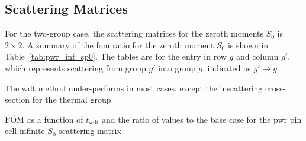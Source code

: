 \subsection{Scattering Matrices}
\label{sec:pwr_inf_total}

For the two-group case, the scattering matrices for the zeroth
moments $S_0$ is $2 \times 2$. A summary of the \gls{fom} ratio
for the zeroth moment $S_0$ is shown in Table~\ref{tab:pwr_inf_sp0}. The
tables are for the entry in row $g$ and column $g'$, which represents
scattering from group $g'$ into group $g$, indicated as $g' \to g$.

The \gls{wdt} method under-performs in most cases, except the
inscattering cross-section for the thermal group. 

\begin{table}[hbtp]
  \centering
  \caption[$\overline{\mathrm{FOM}}$ and ratio for
  the \acrshort{pwr} pin cell infinite $S_0$ scattering matrix.]{$\overline{\mathrm{FOM}}$ as a function of
    $t_{\mathrm{wdt}}$ and the ratio of values to the base case for
    the \gls{pwr} pin cell infinite $S_0$ scattering matrix}


\end{table}
